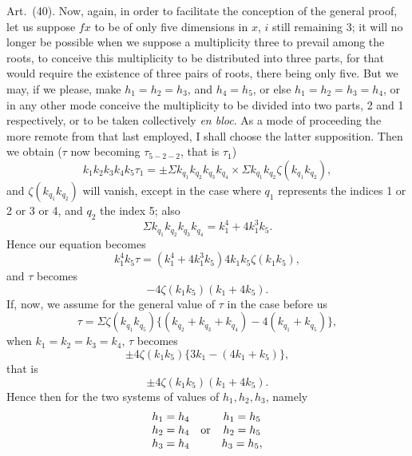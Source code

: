 \documentclass[11pt]{article}
\newcommand{\art}[1]{\par\smallskip\noindent Art.~(#1).\quad}
\begin{document}
\art{40} Now, again, in order to facilitate the conception of the general proof, let us suppose $fx$ to be of only five dimensions in $x$, $i$ still remaining 3; it will no longer be possible when we suppose a multiplicity three to prevail among the roots, to conceive this multiplicity to be distributed into three parts, for that would require the existence of three pairs of roots, there being only five. But we may, if we please, make $h_1=h_2=h_3$, and $h_4=h_5$, or else $h_1=h_2=h_3=h_4$, or in any other mode conceive the multiplicity to be divided into two parts, 2 and 1 respectively, or to be taken collectively \emph{en bloc}. As a mode of proceeding the more remote from that last employed, I shall choose the latter supposition. Then we obtain ($\tau$ now becoming $\tau_{5-2-2}$, that is $\tau_1$)
\[
k_1k_2k_3k_4k_5\tau_1=\pm\Sigma k_{q_1}k_{q_2}k_{q_3}k_{q_4}\times
\Sigma k_{q_1}k_{q_2}\zeta(k_{q_1}k_{q_2}),
\]
and $\zeta(k_{q_1}k_{q_2})$ will vanish, except in the case where $q_1$ represents the indices 1 or 2 or 3 or 4, and $q_2$ the index 5; also
\[
\Sigma k_{q_1}k_{q_2}k_{q_3}k_{q_4}=k_1^4+4k_1^3k_5.
\]
Hence our equation becomes
\[
k_1^4k_5\tau=(k_1^4+4k_1^3k_5)4k_1k_5\zeta(k_1k_5),
\]
and $\tau$ becomes
\[
-4\zeta(k_1k_5)(k_1+4k_5).
\]
If, now, we assume for the general value of $\tau$ in the case before us
\[
\tau=\Sigma\zeta(k_{q_1}k_{q_5})\{(k_{q_2}+k_{q_3}+k_{q_4})-4(k_{q_1}+k_{q_5})\},
\]
when $k_1=k_2=k_3=k_4$, $\tau$ becomes
\[
\pm4\zeta(k_1k_5)\{3k_1-(4k_1+k_5)\},
\]
that is
\[
\pm4\zeta(k_1k_5)(k_1+4k_5).
\]
Hence then for the two systems of values of $h_1,h_2,h_3$, namely
\[
\begin{array}{ccc}
h_1=h_4&&h_1=h_5\cr
h_2=h_4&\hbox{or}&h_2=h_5\cr
h_3=h_4&&h_3=h_5,
\end{array}
\]
\end{document}
